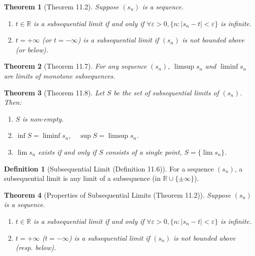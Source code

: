 \documentclass[7pt]{article}
\theoremstyle{definition}
\newtheorem{definition}{Definition}
\theoremstyle{plain}
\newtheorem{theorem}{Theorem}
\begin{document}
\begin{theorem}[Theorem 11.2]
Suppose $ (s_n) $ is a sequence.
\begin{enumerate}
    \item $ t \in \mathbb{R} $ is a subsequential limit if and only if $ \forall \varepsilon > 0, \{n : |s_n - t| < \varepsilon\} $ is infinite.
    \item $ t = +\infty $ (or $ t = -\infty $) is a subsequential limit if $ (s_n) $ is not bounded above (or below).
\end{enumerate}
\end{theorem}

\begin{theorem}[Theorem 11.7]
For any sequence $ (s_n) $, $ \limsup s_n $ and $ \liminf s_n $ are limits of monotone subsequences.
\end{theorem}

\begin{theorem}[Theorem 11.8]
Let $ S $ be the set of subsequential limits of $ (s_n) $. Then:
\begin{enumerate}
    \item $ S $ is non-empty.
    \item $ \inf S = \liminf s_n, \quad \sup S = \limsup s_n $.
    \item $ \lim s_n $ exists if and only if $ S $ consists of a single point, $ S = \{\lim s_n\} $.
\end{enumerate}
\end{theorem}

\begin{definition}[Subsequential Limit (Definition 11.6)]
For a sequence $ (s_n) $, a subsequential limit is any limit of a subsequence (in $ \mathbb{R} \cup \{\pm\infty\} $).
\end{definition}

\begin{theorem}[Properties of Subsequential Limits (Theorem 11.2)]
Suppose $ (s_n) $ is a sequence.
\begin{enumerate}
    \item $ t \in \mathbb{R} $ is a subsequential limit if and only if $ \forall \varepsilon > 0, \{n : |s_n - t| < \varepsilon\} $ is infinite.
    \item $ t = +\infty $ ($ t = -\infty $) is a subsequential limit if $ (s_n) $ is not bounded above (resp. below).
\end{enumerate}
\end{theorem}
\end{document}
